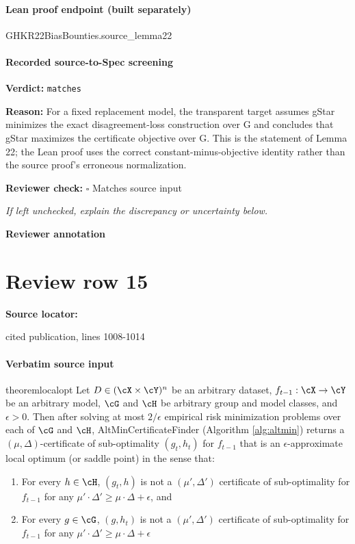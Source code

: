 \documentclass[10pt]{article}
\newcommand{\reviewerbox}{%
  \par\noindent\fbox{\parbox{0.96\linewidth}{\rule{0pt}{0.38in}}}\par
}
\newcommand{\reviewmatch}[1]{%
  \par\noindent\textbf{Reviewer check:} $\square$\; #1\par
  \noindent\emph{If left unchecked, explain the discrepancy or uncertainty below.}\par
}
\begin{document}
\paragraph{Lean proof endpoint (built separately)}\begin{ReviewVerbatim}
GHKR22BiasBounties.source_lemma22
\end{ReviewVerbatim}

\paragraph{Recorded source-to-Spec screening}
\textbf{Verdict:} \texttt{matches}
\\
{\raggedright
\textbf{Reason:} For a fixed replacement model, the transparent target assumes gStar minimizes the exact disagreement-\allowbreak{}loss construction over G and concludes that gStar maximizes the certificate objective over G.\allowbreak{} This is the statement of Lemma 22;\allowbreak{} the Lean proof uses the correct constant-\allowbreak{}minus-\allowbreak{}objective identity rather than the source proof's erroneous normalization.\allowbreak{}
\par}
\reviewmatch{Matches source input}
\noindent\textbf{Reviewer annotation}\par
\reviewerbox
\clearpage
\hypertarget{source-claim-9db1d587dce3a240}{}
\section*{Review row 15}
\textbf{Source locator:} {\footnotesize\raggedright cited publication, lines 1008-\allowbreak{}1014\par}
\paragraph{Verbatim source input}
\begin{ReviewVerbatim}
\begin{restatable}{theorem}{localopt}
Let $D \in (\cX\times\cY)^n$ be an arbitrary dataset, $f_{t-1}:\cX\rightarrow \cY$ be an arbitrary model, $\cG$ and $\cH$ be arbitrary group and model classes, and $\epsilon > 0$. Then after solving at most $2/\epsilon$ empirical risk minimization problems over each of $\cG$ and $\cH$, AltMinCertificateFinder (Algorithm \ref{alg:altmin}) returns a $(\mu,\Delta)$-certificate of sub-optimality $(g_t,h_t)$ for $f_{t-1}$  that is an $\epsilon$-approximate local optimum (or saddle point) in the sense that:
\begin{enumerate}
    \item For every $h \in \cH$, $(g_t,h)$ is not a $(\mu', \Delta')$ certificate of sub-optimality for $f_{t-1}$ for any $\mu'\cdot \Delta' \geq \mu\cdot \Delta + \epsilon$, and
    \item For every $g \in \cG$, $(g,h_t)$ is not a $(\mu', \Delta')$ certificate of sub-optimality for $f_{t-1}$ for any $\mu'\cdot \Delta' \geq \mu\cdot \Delta + \epsilon$
\end{enumerate}
\end{restatable}
\end{ReviewVerbatim}
\end{document}
